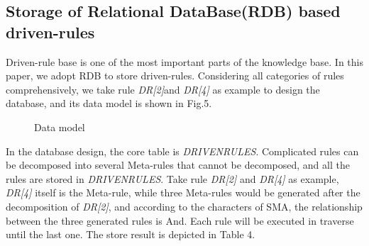 \documentclass{elsarticle}
\begin{document}
\subsection{ Storage of Relational DataBase(RDB) based
driven-rules}
\label{sec:stor-relat-datab-1}

\textrm{Driven-rule base is one of the most important parts of the
knowledge base. In this paper, we adopt RDB to store driven-rules.
Considering all categories of rules comprehensively, we take rule
}\textrm{\textit{DR[2]}}\textrm{and }\textrm{\textit{DR[4]}}\textrm{ as
example to design the database, and its data model is shown in Fig.5. 
}

  \begin{figure}[ht]
    \centering
    \scalebox{0.5}{\texttt{[image: 05]}}
    \caption{Data model }
  \end{figure}



\textrm{In the database design, the core table is
}\textrm{\textit{DRIVENRULES}}\textrm{. Complicated rules can be
decomposed into several Meta-rules that cannot be decomposed, and all
the rules are stored in }\textrm{\textit{DRIVENRULES}}\textrm{. Take
rule }\textrm{\textit{DR[2]}}\textrm{ and
}\textrm{\textit{DR[4]}}\textrm{ as example,
}\textrm{\textit{DR[4]}}\textrm{ itself is the Meta-rule, while three
Meta-rules would be generated after the decomposition of
}\textrm{\textit{DR[2]}}\textrm{, and according to the characters of
SMA, the relationship between the three generated rules is And.
Each rule will be executed in traverse until the last one. The store
result is depicted in Table 4.}
\end{document}
